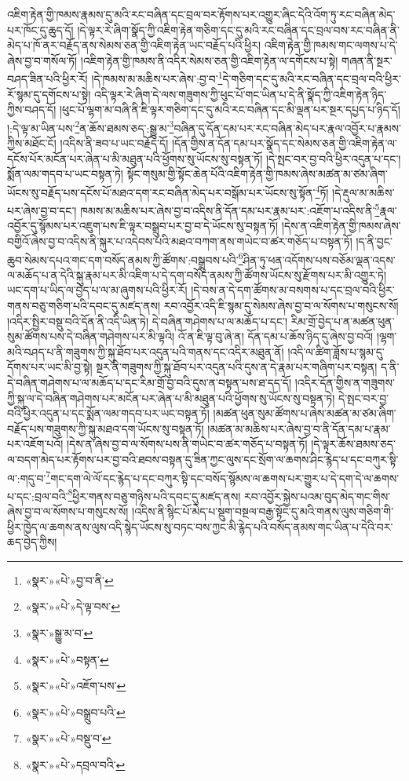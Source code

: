 འཇིག་རྟེན་གྱི་ཁམས་རྣམས་དུ་མའི་རང་བཞིན་དང་བྲལ་བར་རྟོགས་པར་འགྱུར་ཞིང་དེའི་འོག་ཏུ་རང་བཞིན་མེད་པར་ཁོང་དུ་ཆུད་དོ། །དེ་ལྟར་རེ་ཞིག་སྣོད་ཀྱི་འཇིག་རྟེན་གཅིག་དང་དུ་མའི་རང་བཞིན་དང་བྲལ་བས་རང་བཞིན་ནི་མེད་པ་ཁོ་ནར་བརྗོད་ནས་སེམས་ཅན་གྱི་འཇིག་རྟེན་ཡང་བརྗོད་པའི་ཕྱིར། འཇིག་རྟེན་གྱི་ཁམས་གང་ལགས་པ་དེ་ཞེས་བྱ་བ་གསོལ་ཏོ། །འཇིག་རྟེན་གྱི་ཁམས་ནི་འདིར་སེམས་ཅན་གྱི་འཇིག་རྟེན་ལ་དགོངས་པ་སྟེ། གཞན་ནི་སྔར་བཤད་ཟིན་པའི་ཕྱིར་རོ། །དེ་ཁམས་མ་མཆིས་པར་ཞེས་:བྱ་བ་\footnote{«སྣར་»«པེ་»བྱ་བ་ནི་}དེ་གཅིག་དང་དུ་མའི་རང་བཞིན་དང་བྲལ་བའི་ཕྱིར་རོ་སྙམ་དུ་དགོངས་པ་སྟེ། འདི་ལྟར་རེ་ཞིག་དེ་ལས་གཟུགས་ཀྱི་ཕུང་པོ་གང་ཡིན་པ་དེ་ནི་སྣོད་ཀྱི་འཇིག་རྟེན་ཉིད་ཀྱིས་བཤད་དོ། །ཕུང་པོ་ལྷག་མ་བཞི་ནི་ཇི་ལྟར་གཅིག་དང་དུ་མའི་རང་བཞིན་དང་མི་ལྡན་པར་སྔར་དཔྱད་པ་ཉིད་དོ། །:དེ་ལྟ་མ་ཡིན་པས་\footnote{«སྣར་»«པེ་»དེ་ལྟ་བས་}ན་ཆོས་ཐམས་ཅད་:སྒྱུ་མ་\footnote{«སྣར་»སྒྱུ་མ་བ་}བཞིན་དུ་དོན་དམ་པར་རང་བཞིན་མེད་པར་རྣལ་འབྱོར་པ་རྣམས་ཀྱིས་མཐོང་ངོ། །འདིས་ནི་ཟབ་པ་ཡང་བརྗོད་དོ། །དོན་གྱིས་ན་དོན་དམ་པར་སྣོད་དང་སེམས་ཅན་གྱི་འཇིག་རྟེན་ལ་དངོས་པོར་མངོན་པར་ཞེན་པ་མི་མཐུན་པའི་ཕྱོགས་སུ་ཡོངས་སུ་བསྟན་ཏོ། །དེ་སྤང་བར་བྱ་བའི་ཕྱིར་འདུན་པ་དང་། སྨོན་ལམ་གདབ་པ་ཡང་བསྟན་ཏེ། སྟོང་གསུམ་གྱི་སྟོང་ཆེན་པོའི་འཇིག་རྟེན་གྱི་ཁམས་ཞེས་མཚན་མ་ཙམ་ཞིག་ཡོངས་སུ་བརྗོད་པས་དངོས་པོ་མཐའ་དག་རང་བཞིན་མེད་པར་བསྒོམ་པར་ཡོངས་སུ་སྟོན་\footnote{«སྣར་»«པེ་»བསྟན་}ཏོ། །དེ་རྡུལ་མ་མཆིས་པར་ཞེས་བྱ་བ་དང་། ཁམས་མ་མཆིས་པར་ཞེས་བྱ་བ་འདིས་ནི་དོན་དམ་པར་རྣམ་པར་:འཇོག་པ་འདིས་ནི་\footnote{«སྣར་»«པེ་»འཇོག་པས་}རྣལ་འབྱོར་དུ་སྙོམས་པར་འཇུག་པས་ཇི་ལྟར་བསྒྲུབ་པར་བྱ་བ་དེ་ཡོངས་སུ་བསྟན་ཏོ། །དེས་ན་འཇིག་རྟེན་གྱི་ཁམས་ཞེས་བགྱིའོ་ཞེས་བྱ་བ་འདིས་ནི་སྐུར་པ་འདེབས་པའི་མཐའ་བཀག་ནས་གཡེང་བ་ཚར་གཅོད་པ་བསྟན་ཏོ། །ད་ནི་བྱང་ཆུབ་སེམས་དཔའ་གང་དག་བསོད་ནམས་ཀྱི་ཚོགས་:བསྒྲུབས་པའི་\footnote{«སྣར་»«པེ་»བསྒྲུབ་པའི་}ཤིན་ཏུ་ཕན་འདོགས་པས་བཅོམ་ལྡན་འདས་ལ་མཆོད་པ་ན་དེའི་སྐུ་རྣམ་པར་མི་འཇིག་པ་དེ་དག་བསོད་ནམས་ཀྱི་ཚོགས་ཡོངས་སུ་རྫོགས་པར་མི་འགྱུར་ཏེ། ཡང་དག་པ་ཡིད་ལ་བྱེད་པ་ལ་མ་ཞུགས་པའི་ཕྱིར་རོ། །དེ་བས་ན་དེ་དག་ཚོགས་མ་བསགས་པ་དང་བྲལ་བའི་ཕྱིར་གནས་བཅུ་གཅིག་པའི་དབང་དུ་མཛད་ནས། རབ་འབྱོར་འདི་ཇི་སྙམ་དུ་སེམས་ཞེས་བྱ་བ་ལ་སོགས་པ་གསུངས་སོ། །འདིར་སྤྱིར་བསྡུ་བའི་དོན་ནི་འདི་ཡིན་ཏེ། དེ་བཞིན་གཤེགས་པ་ལ་མཆོད་པ་དང་། རིམ་གྲོ་བྱེད་པ་ན་མཚན་ཕུན་སུམ་ཚོགས་པས་དེ་བཞིན་གཤེགས་པར་མི་ལྟའི། འོ་ན་ཇི་ལྟ་བུ་ཞེ་ན། དོན་དམ་པ་ཆོས་ཉིད་དུ་ཞེས་བྱ་བའོ། །ལྷག་མའི་བཤད་པ་ནི་གཟུགས་ཀྱི་སྐུ་ཐོབ་པར་འདུན་པའི་གནས་དང་འདིར་མཐུན་ནོ། །འདི་ལ་ཚིག་ཟློས་པ་སྙམ་དུ་དོགས་པར་ཡང་མི་བྱ་སྟེ། སྔར་ནི་གཟུགས་ཀྱི་སྐུ་ཐོབ་པར་འདུན་པའི་དུས་ན་དེ་རྣམ་པར་གཞིག་པར་བསྟན། ད་ནི་དེ་བཞིན་གཤེགས་པ་ལ་མཆོད་པ་དང་རིམ་གྲོ་བྱ་བའི་དུས་ན་བསྟན་པས་ཐ་དད་དོ། །འདིར་དོན་གྱིས་ན་གཟུགས་ཀྱི་སྐུ་ལ་དེ་བཞིན་གཤེགས་པར་མངོན་པར་ཞེན་པ་མི་མཐུན་པའི་ཕྱོགས་སུ་ཡོངས་སུ་བསྟན་ཏེ། དེ་སྤང་བར་བྱ་བའི་ཕྱིར་འདུན་པ་དང་སྨོན་ལམ་གདབ་པར་ཡང་བསྟན་ཏོ། །མཚན་ཕུན་སུམ་ཚོགས་པ་ཞེས་མཚན་མ་ཙམ་ཞིག་བརྗོད་པས་གཟུགས་ཀྱི་སྐུ་མཐའ་དག་ཡོངས་སུ་བསྟན་ཏོ། །མཚན་མ་མཆིས་པར་ཞེས་བྱ་བ་ནི་དོན་དམ་པ་རྣམ་པར་འཇོག་པའོ། །དེས་ན་ཞེས་བྱ་བ་ལ་སོགས་པས་ནི་གཡེང་བ་ཚར་གཅོད་པ་བསྟན་ཏོ། །དེ་ལྟར་ཆོས་ཐམས་ཅད་ལ་བདག་མེད་པར་རྟོགས་པར་བྱ་བའི་ཐབས་བསྟན་དུ་ཟིན་ཀྱང་ལུས་དང་སྲོག་ལ་ཆགས་ཤིང་རྙེད་པ་དང་བཀུར་སྟི་ལ་:གདུ་བ་\footnote{«སྣར་»«པེ་»བསྡུ་བ་}གང་དག་ལེ་ལོ་དང་རྙེད་པ་དང་བཀུར་སྟི་དང་བསོད་སྙོམས་ལ་ཆགས་པར་གྱུར་པ་དེ་དག་དེ་ལ་ཆགས་པ་དང་:བྲལ་བའི་\footnote{«སྣར་»«པེ་»དབྲལ་བའི་}ཕྱིར་གནས་བཅུ་གཉིས་པའི་དབང་དུ་མཛད་ནས། རབ་འབྱོར་སྐྱེས་པའམ་བུད་མེད་གང་གིས་ཞེས་བྱ་བ་ལ་སོགས་པ་གསུངས་སོ། །འདིས་ནི་སྙིང་པོ་མེད་པ་སྡུག་བསྔལ་བརྒྱ་སྟོང་དུ་མའི་གནས་ལུས་གཅིག་གི་ཕྱིར་ཁྱེད་ལ་ཆགས་ནས་ལུས་འདི་སྙེད་ཡོངས་སུ་བཏང་བས་ཀྱང་མི་རྙེད་པའི་བསོད་ནམས་གང་ཡིན་པ་དེའི་བར་ཆད་བྱེད་ཀྱིས། 
